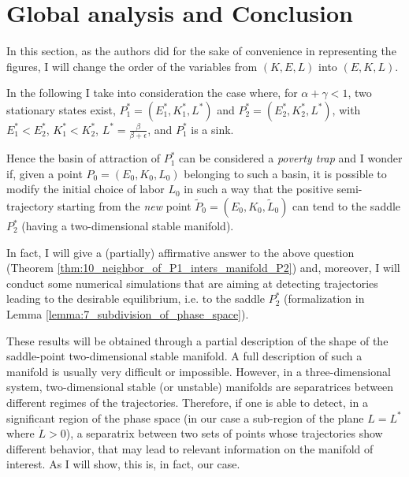 \section{Global analysis and Conclusion}\label{Sec:glob_anal_conclusion}
In this section, as the authors did for the sake of convenience in representing the figures, I will change the order of the variables from $(K,E,L)$ into $(E,K,L)$.

In the following I take into consideration the case where, for $\alpha+\gamma<1$, two stationary states exist, $P_1^* = (E_1^*,K_1^*,L^*)$ and $P_2^* = (E_2^*,K_2^*,L^*)$, with $E_1^* < E_2^*$, $K_1^* < K_2^*$, $L^* = \frac{\beta}{\beta+\epsilon}$, and $P_1^*$ is a sink.

Hence the basin of attraction of $P_1^*$ can be considered a \textit{poverty trap} and I wonder if, given a point $P_0 = (E_0,K_0,L_0)$ belonging to such a basin, it is possible to modify the initial choice of labor $L_0$ in such a way that the positive semi-trajectory starting from the \textit{new} point $\widetilde{P}_0 = (E_0,K_0,\widetilde{L}_0)$ can tend to the saddle $P_2^*$ (having a two-dimensional stable manifold).

In fact, I will give a (partially) affirmative answer to the above question (Theorem \ref{thm:10_neighbor_of_P1_inters_manifold_P2}) and, moreover, I will conduct some numerical simulations that are aiming at detecting trajectories leading to the desirable equilibrium, i.e. to the saddle $P_2^*$ (formalization in Lemma \ref{lemma:7_subdivision_of_phase_space}).

These results will be obtained through a partial description of the shape of the saddle-point two-dimensional stable manifold. A full description of such a manifold is usually very difficult or impossible. However, in a three-dimensional system, two-dimensional stable (or unstable) manifolds are separatrices between different regimes of the trajectories. Therefore, if one is able to detect, in a significant region of the phase space (in our case a sub-region of the plane $L = L^*$ where $\dot{L}>0$), a separatrix between two sets of points whose trajectories show different behavior, that may lead to relevant information on the manifold of interest. As I will show, this is, in fact, our case.

